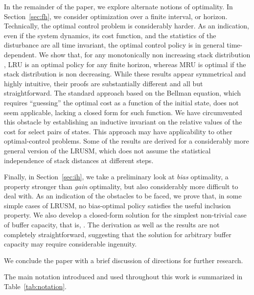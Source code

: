 \documentclass[11pt,a4paper]{article}
\theoremstyle{definition}
\theoremstyle{remark}
\begin{document}
In the remainder of the paper, we explore alternate notions of
optimality. In Section~\ref{sec:fh}, we consider optimization over a
finite interval, or horizon.  Technically, the optimal control problem
is considerably harder. As an indication, even if the system dynamics,
its cost function, and the statistics of the disturbance are all time
invariant, the optimal control policy is in general time-dependent.
We show that, for any monotonically non increasing stack distribution
, LRU is an optimal policy for any finite horizon, whereas MRU is
optimal if the stack distribution is non decreasing.  While these
results appear symmetrical and highly intuitive, their proofs are
substantially different and all but straightforward.  The standard
approach based on the Bellman equation, which requires ``guessing''
the optimal cost as a function of the initial state, does not seem
applicable, lacking a closed form for such function. We have
circumvented this obstacle by establishing an inductive invariant on
the relative values of the cost for select pairs of states. This
approach may have applicability to other optimal-control problems.
Some of the results are derived for a considerably more general
version of the LRUSM, which does not assume the statistical
independence of stack distances at different steps.

Finally, in Section~\ref{sec:ih}, we take a preliminary look at 
\emph{bias} optimality, a property stronger than \emph{gain} optimality,
but also considerably more difficult to deal with. As an indication of
the obstacles to be faced, we prove that, in some simple cases of
LRUSM, no bias-optimal policy satisfies the useful inclusion property.
We also develop a closed-form solution for the simplest non-trivial
case of buffer capacity, that is, .  The derivation as well as
the results are not completely straightforward, suggesting that the
solution for arbitrary buffer capacity may require considerable
ingenuity.

We conclude the paper with a brief discussion of directions for
further research.

The main notation introduced and used throughout this work is summarized in
Table~\ref{tab:notation}.
\end{document}
